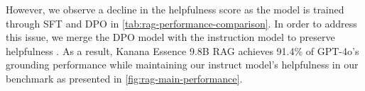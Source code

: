 However, we observe a decline in the helpfulness score as the model is trained through SFT and DPO in \autoref{tab:rag-performance-comparison}.
In order to address this issue, we merge the DPO model with the instruction model to preserve helpfulness \citep{kim2024prometheus2opensource}.
As a result, Kanana Essence 9.8B RAG achieves 91.4\% of GPT-4o's grounding performance while maintaining our instruct model's helpfulness in our benchmark as presented in \autoref{fig:rag-main-performance}.

    

